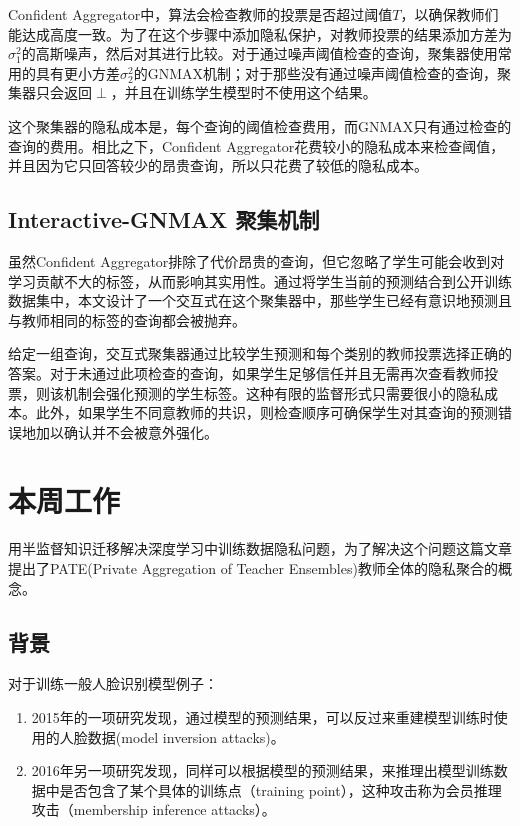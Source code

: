 \documentclass[a4paper]{article}
\begin{document}
Confident Aggregator中，算法会检查教师的投票是否超过阈值$T$，以确保教师们能达成高度一致。为了在这个步骤中添加隐私保护，对教师投票的结果添加方差为$\sigma_1^2$的高斯噪声，然后对其进行比较。对于通过噪声阈值检查的查询，聚集器使用常用的具有更小方差$\sigma_2^2$的GNMAX机制；对于那些没有通过噪声阈值检查的查询，聚集器只会返回$\perp$，并且在训练学生模型时不使用这个结果。

这个聚集器的隐私成本是，每个查询的阈值检查费用，而GNMAX只有通过检查的查询的费用。相比之下，Confident Aggregator花费较小的隐私成本来检查阈值，并且因为它只回答较少的昂贵查询，所以只花费了较低的隐私成本。

\subsection{Interactive-GNMAX 聚集机制}

虽然Confident Aggregator排除了代价昂贵的查询，但它忽略了学生可能会收到对学习贡献不大的标签，从而影响其实用性。通过将学生当前的预测结合到公开训练数据集中，本文设计了一个交互式在这个聚集器中，那些学生已经有意识地预测且与教师相同的标签的查询都会被抛弃。

给定一组查询，交互式聚集器通过比较学生预测和每个类别的教师投票选择正确的答案。对于未通过此项检查的查询，如果学生足够信任并且无需再次查看教师投票，则该机制会强化预测的学生标签。这种有限的监督形式只需要很小的隐私成本。此外，如果学生不同意教师的共识，则检查顺序可确保学生对其查询的预测错误地加以确认并不会被意外强化。
\section{本周工作}

\cite{Papernot2016SemisupervisedKT}\cite{Papernot2016SemisupervisedKT}用半监督知识迁移解决深度学习中训练数据隐私问题，为了解决这个问题这篇文章提出了PATE(Private Aggregation of Teacher Ensembles)教师全体的隐私聚合的概念。


\subsection{背景}

对于训练一般人脸识别模型例子：
\begin{enumerate}
\item 2015年的一项研究发现\cite{fredrikson2015model}，通过模型的预测结果，可以反过来重建模型训练时使用的人脸数据(model inversion attacks)。
\item 2016年另一项研究发现\cite{shokri2017membership}，同样可以根据模型的预测结果，来推理出模型训练数据中是否包含了某个具体的训练点（training point），这种攻击称为会员推理攻击（membership inference attacks）。
\end{enumerate}
\end{document}

